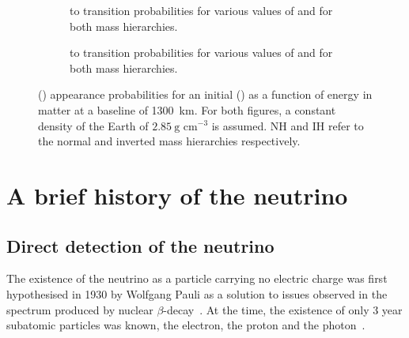 \begin{figure}[h]
  \centering
  \begin{subfigure}[t]{0.49\textwidth}
    \begin{adjustbox}{max totalsize={\textwidth}, center}
      
    \end{adjustbox}
    \caption{\numu to \nue transition probabilities for various values of \dcp and for both mass hierarchies.}
  \end{subfigure}
  \hfill
  \begin{subfigure}[t]{0.49\textwidth}
    \begin{adjustbox}{max totalsize={\textwidth}, center}
      
    \end{adjustbox}
    \caption{\anumu to \anue transition probabilities for various values of \dcp and for both mass hierarchies.}
  \end{subfigure}
  \caption[\nue and \anue appearance probabilities in matter.]{\nue(\anue) appearance probabilities for an initial \numu(\anumu) as a function of energy in matter at a baseline of 1300~km. For both figures, a constant density of the Earth of $2.85~\text{g~cm}^{-3}$ is assumed. NH and IH refer to the normal and inverted mass hierarchies respectively.}
  \label{fig:threeNuMatter}
\end{figure}

\section{A brief history of the neutrino}
\label{sec:theory:history}

\subsection{Direct detection of the neutrino}
\label{sec:theory:history:detection}

The existence of the neutrino as a particle carrying no electric charge was first hypothesised in 1930 by Wolfgang Pauli as a solution to issues observed in the spectrum produced by nuclear $\beta$-decay~\cite{pauliNeutrino}.
At the time, the existence of only 3 year subatomic particles was known, the electron, the proton and the photon~\cite{ideaOfNeutrino}.
 
